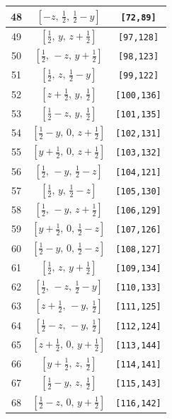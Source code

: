 \documentclass[fleqn,8pt]{jsarticle}
\begin{document}
\begin{longtable}{ccc}
48 & $\left[ - z,\, \frac{1}{2},\, \frac{1}{2} - y \right]$ & {\tt [72,89]} \\ \hline
49 & $\left[ \frac{1}{2},\, y,\, z + \frac{1}{2} \right]$ & {\tt [97,128]} \\ \hline
50 & $\left[ \frac{1}{2},\, - z,\, y + \frac{1}{2} \right]$ & {\tt [98,123]} \\ \hline
51 & $\left[ \frac{1}{2},\, z,\, \frac{1}{2} - y \right]$ & {\tt [99,122]} \\ \hline
52 & $\left[ z + \frac{1}{2},\, y,\, \frac{1}{2} \right]$ & {\tt [100,136]} \\ \hline
53 & $\left[ \frac{1}{2} - z,\, y,\, \frac{1}{2} \right]$ & {\tt [101,135]} \\ \hline
54 & $\left[ \frac{1}{2} - y,\, 0,\, z + \frac{1}{2} \right]$ & {\tt [102,131]} \\ \hline
55 & $\left[ y + \frac{1}{2},\, 0,\, z + \frac{1}{2} \right]$ & {\tt [103,132]} \\ \hline
56 & $\left[ \frac{1}{2},\, - y,\, \frac{1}{2} - z \right]$ & {\tt [104,121]} \\ \hline
57 & $\left[ \frac{1}{2},\, y,\, \frac{1}{2} - z \right]$ & {\tt [105,130]} \\ \hline
58 & $\left[ \frac{1}{2},\, - y,\, z + \frac{1}{2} \right]$ & {\tt [106,129]} \\ \hline
59 & $\left[ y + \frac{1}{2},\, 0,\, \frac{1}{2} - z \right]$ & {\tt [107,126]} \\ \hline
60 & $\left[ \frac{1}{2} - y,\, 0,\, \frac{1}{2} - z \right]$ & {\tt [108,127]} \\ \hline
61 & $\left[ \frac{1}{2},\, z,\, y + \frac{1}{2} \right]$ & {\tt [109,134]} \\ \hline
62 & $\left[ \frac{1}{2},\, - z,\, \frac{1}{2} - y \right]$ & {\tt [110,133]} \\ \hline
63 & $\left[ z + \frac{1}{2},\, - y,\, \frac{1}{2} \right]$ & {\tt [111,125]} \\ \hline
64 & $\left[ \frac{1}{2} - z,\, - y,\, \frac{1}{2} \right]$ & {\tt [112,124]} \\ \hline
65 & $\left[ z + \frac{1}{2},\, 0,\, y + \frac{1}{2} \right]$ & {\tt [113,144]} \\ \hline
66 & $\left[ y + \frac{1}{2},\, z,\, \frac{1}{2} \right]$ & {\tt [114,141]} \\ \hline
67 & $\left[ \frac{1}{2} - y,\, z,\, \frac{1}{2} \right]$ & {\tt [115,143]} \\ \hline
68 & $\left[ \frac{1}{2} - z,\, 0,\, y + \frac{1}{2} \right]$ & {\tt [116,142]} \\ \hline

\end{longtable}
\end{document}
